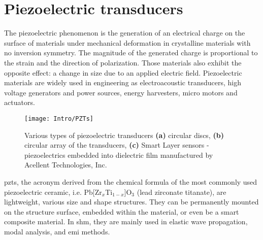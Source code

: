 \section{Piezoelectric transducers}
\label{sec:PZT}

The piezoelectric phenomenon is the generation of an electrical charge on the surface of materials under mechanical deformation in crystalline materials with no inversion symmetry.
The magnitude of the generated charge is proportional to the strain and the direction of polarization.
Those materials also exhibit the opposite effect: a change in size due to an applied electric field.
Piezoelectric materials are widely used in engineering as electroacoustic transducers, high voltage generators and power sources, energy harvesters, micro motors and actuators.
\begin{figure}[H]
	\begin{center}
		\texttt{[image: Intro/PZTs]}
	\end{center}
	\caption{Various types of piezoelectric transducers \textbf{(a)} circular discs, \textbf{(b)} circular array of the transducers, \textbf{(c)} Smart Layer\textsuperscript{\tiny\textregistered} sensors - piezoelectrics embedded into dielectric film manufactured by Acellent Technologies, Inc.}
	\label{fig:piezo}
\end{figure}
\Acp{pzt}, the acronym derived from the chemical formula of the most commonly used piezoelectric ceramic, i.e. Pb[Zr\(_x\)Ti\(_{1-x}\)]O\(_3\) (lead zirconate titanate), are lightweight, various size and shape structures. 
They can be permanently mounted on the structure surface, embedded within the material, or even be a smart composite material.
In \ac{shm}, they are mainly used in elastic wave propagation, modal analysis, and \ac{emi} methods.